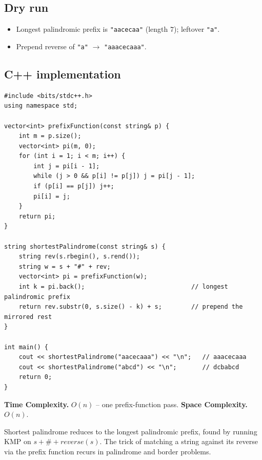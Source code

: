 \subsection*{Dry run}


\begin{itemize}
  \item Longest palindromic prefix is \texttt{"aacecaa"} (length $7$);
        leftover \texttt{"a"}.
  \item Prepend reverse of \texttt{"a"} $\to$ \texttt{"aaacecaaa"}.
\end{itemize}

\subsection*{C++ implementation}

\begin{lstlisting}
#include <bits/stdc++.h>
using namespace std;

vector<int> prefixFunction(const string& p) {
    int m = p.size();
    vector<int> pi(m, 0);
    for (int i = 1; i < m; i++) {
        int j = pi[i - 1];
        while (j > 0 && p[i] != p[j]) j = pi[j - 1];
        if (p[i] == p[j]) j++;
        pi[i] = j;
    }
    return pi;
}

string shortestPalindrome(const string& s) {
    string rev(s.rbegin(), s.rend());
    string w = s + "#" + rev;
    vector<int> pi = prefixFunction(w);
    int k = pi.back();                             // longest palindromic prefix
    return rev.substr(0, s.size() - k) + s;        // prepend the mirrored rest
}

int main() {
    cout << shortestPalindrome("aacecaaa") << "\n";   // aaacecaaa
    cout << shortestPalindrome("abcd") << "\n";       // dcbabcd
    return 0;
}
\end{lstlisting}

\begin{complexitybox}
\textbf{Time Complexity.} $O(n)$ -- one prefix-function pass. \textbf{Space
Complexity.} $O(n)$.
\end{complexitybox}

\begin{takeawaybox}
Shortest palindrome reduces to the longest palindromic prefix, found by
running KMP on $s+\#+\textit{reverse}(s)$. The trick of matching a string
against its reverse via the prefix function recurs in palindrome and
border problems.
\end{takeawaybox}
